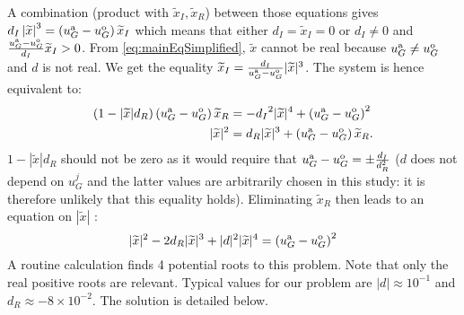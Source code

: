 A combination (product with ${\widetilde{x}_I}, \widetilde{x}_R$)
between those equations gives
${d_I}\left|\widetilde{x}\right|^3 = \left(u_G^{\rm a} - u_G^{\rm o}\right) {\widetilde{x}_I}$ which means that either ${d_I}=\widetilde{x}_I=0$ or ${d_I}\neq 0$ and $\frac{u_G^{\rm a} - u_G^{\rm o}}{{d_I}}{\widetilde{x}_I}>0$.
From \eqref{eq:mainEqSimplified}, $\widetilde{x}$ cannot be real because $u_G^{\rm a} \neq u_G^{\rm o}$ and $d$ is not real.
We get the equality
$\widetilde{x}_I = \frac{{d_I}}{u_G^{\rm a} - u_G^{\rm o}} |\widetilde{x}|^3$.
The system is hence equivalent to:
\begin{equation}
    \begin{aligned}
    \left(1 - |\widetilde{x}| d_R\right)
    \left(u_G^{\rm a} - u_G^{\rm o}\right)\widetilde{x}_R &=
    -{d_I}^2 |\widetilde{x}|^4 + \left(u_G^{\rm a} - u_G^{\rm o}\right)^2 \\
    |\widetilde{x}|^2 &=
    {d_R} |\widetilde{x}|^3 + \left(u_G^{\rm a} - u_G^{\rm o}\right)\widetilde{x}_R.
    \end{aligned}
\end{equation}
$1 - |\widetilde{x}| d_R$ should not be zero as it would require that $u_G^{\rm a} - u_G^{\rm o} = \pm \frac{d_I}{d_R^2}$ ($d$ does not depend on $u_G^j$ and the latter values are arbitrarily chosen in this study:
it is therefore unlikely that this equality holds).
Eliminating $\widetilde{x}_R$ then leads to an equation on $|\widetilde{x}|$ :
\begin{equation} \label{eq:mainPolynomial}
    |\widetilde{x}|^2 -  2{d_R} |\widetilde{x}|^3 + 
    |d|^2 |\widetilde{x}|^4
    =\left(u_G^{\rm a} - u_G^{\rm o}\right)^2
\end{equation}
A routine calculation finds 4 potential roots to this problem. Note that only the real positive roots are relevant.
Typical values for our problem are 
$|d| \approx 10^{-1}$ and $d_R \approx -8 \times 10^{-2}$.
The solution is detailed below.
